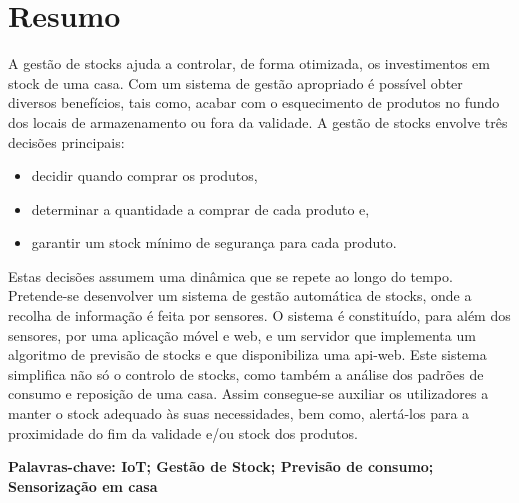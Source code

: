 \cleardoublepage\newpage
\chapter*{Resumo} \label{resumo}
A gestão de stocks ajuda a controlar, de forma otimizada, os investimentos em stock de uma casa. Com um sistema de gestão apropriado é possível obter diversos benefícios, tais como, acabar com o esquecimento de produtos no fundo dos locais de armazenamento ou fora da validade.
A gestão de stocks envolve três decisões principais:

\begin{itemize}
	\item decidir quando comprar os produtos,
	\item determinar a quantidade a comprar de cada produto e,
	\item garantir um stock mínimo de segurança para cada produto.
\end{itemize}

Estas decisões assumem uma dinâmica que se repete ao longo do tempo. Pretende-se desenvolver um sistema de gestão automática de stocks, onde a recolha de informação é feita por sensores. O sistema é constituído, para além dos sensores, por uma aplicação móvel e web, e um servidor que implementa um algoritmo de previsão de stocks e que disponibiliza uma \gls{api-web}. Este sistema simplifica não só o controlo de stocks, como também a análise dos padrões de consumo e reposição de uma casa. Assim consegue-se auxiliar os utilizadores a manter o stock adequado às suas necessidades, bem como, alertá-los para a proximidade do fim da validade e/ou stock dos produtos.

\vspace{0.2cm}
{\bf Palavras-chave: IoT; Gestão de Stock; Previsão de consumo; Sensorização em casa} 
